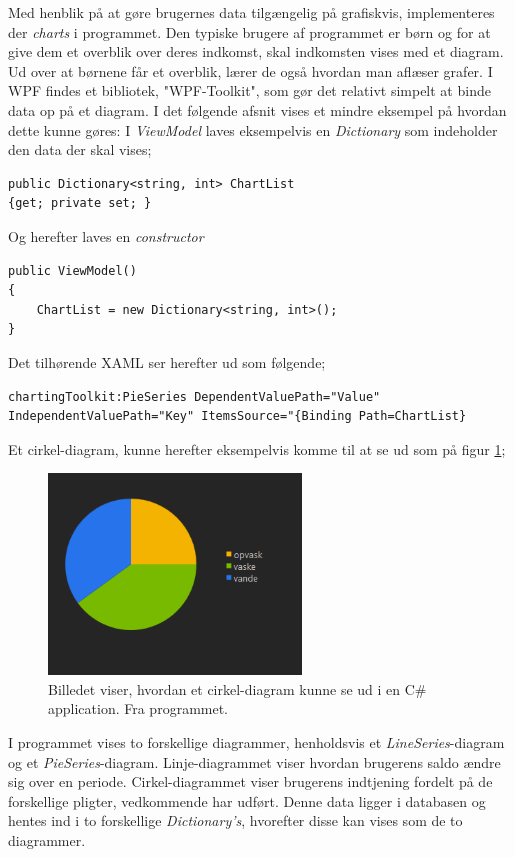 Med henblik på at gøre brugernes data tilgængelig på grafiskvis, implementeres der \textit{charts} i programmet. Den typiske brugere af programmet er børn og for at give dem et overblik over deres indkomst, skal indkomsten vises med et diagram. Ud over at børnene får et overblik, lærer de også hvordan man aflæser grafer.
I WPF findes et bibliotek, "WPF-Toolkit", som gør det relativt simpelt at binde data op på et diagram. I det følgende afsnit vises et mindre eksempel på hvordan dette kunne gøres:
I \textit{ViewModel} laves eksempelvis en \textit{Dictionary} som indeholder den data der skal vises;

\begin{lstlisting}
public Dictionary<string, int> ChartList
{get; private set; }
\end{lstlisting}

Og herefter laves en \textit{constructor}

\begin{lstlisting}
public ViewModel()
{
	ChartList = new Dictionary<string, int>();
}
\end{lstlisting}

Det tilhørende XAML ser herefter ud som følgende;

\begin{lstlisting}
chartingToolkit:PieSeries DependentValuePath="Value" IndependentValuePath="Key" ItemsSource="{Binding Path=ChartList}
\end{lstlisting}

Et cirkel-diagram, kunne herefter eksempelvis komme til at se ud som på figur \ref{cirkeldia};

\begin{figure}[H]
\centering
\includegraphics[width=0.6\textwidth]{Billeder/cirkeldia.png}
\caption{Billedet viser, hvordan et cirkel-diagram kunne se ud i en C\# application. Fra programmet.}
\label{cirkeldia}
\end{figure}

I programmet vises to forskellige diagrammer, henholdsvis et \textit{LineSeries}-diagram og et \textit{PieSeries}-diagram. Linje-diagrammet viser hvordan brugerens saldo ændre sig over en periode. Cirkel-diagrammet viser brugerens indtjening fordelt på de forskellige pligter, vedkommende har udført. Denne data ligger i databasen og hentes ind i to forskellige \textit{Dictionary’s}, hvorefter disse kan vises som de to diagrammer. 

